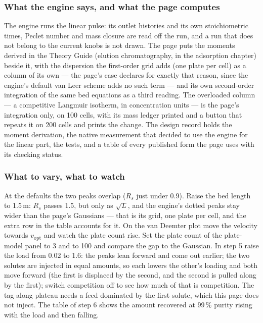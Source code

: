 \documentclass[11pt,a4paper]{article}
\begin{document}
\subsubsection*{What the engine says, and what the page computes}

The engine runs the linear pulse: its outlet histories and its own
stoichiometric times, Peclet number and mass closure are read off the run,
and a run that does not belong to the current knobs is not drawn.  The page
puts the moments derived in the Theory Guide (elution chromatography, in the adsorption chapter) beside it, with the
dispersion the first-order grid adds (one plate per cell) as a
column of its own --- the page's case declares  for exactly that reason, since the engine's default van Leer
scheme adds no such term --- and its own second-order integration of the same bed
equations as a third reading.  The overloaded column --- a competitive
Langmuir isotherm, in concentration units --- is the page's integration
only, on 100 cells, with its mass ledger printed and a button that repeats
it on 200 cells and prints the change.  The design record
 holds the moment
derivation, the native measurement that decided to use the engine for the
linear part, the tests, and a table of every published form the page uses
with its checking status.

\subsubsection*{What to vary, what to watch}

\begin{tryit}
At the defaults the two peaks overlap ($R_s$ just under 0.9).  Raise the bed
length to 1.5\,m: $R_s$ passes 1.5, but only as $\sqrt{L}$, and the engine's
dotted peaks stay wider than the page's Gaussians --- that is its grid, one
plate per cell, and the extra row in the table accounts for it.  On the
van Deemter plot move the velocity towards $v_{\mathrm{opt}}$ and watch the
plate count rise.  Set the plate count of the plate-model panel to 3 and to
100 and compare the gap to the Gaussian.  In step 5 raise the load from 0.02
to 1.6: the peaks lean forward and come out earlier; the two solutes are
injected in equal amounts, so each lowers the other's loading and both move
forward (the first is displaced by the second, and the second is pulled
along by the first); switch competition off to see how much of that is
competition.  The tag-along plateau needs a feed dominated by the first
solute, which this page does not inject.  The table of step 6 shows the amount recovered at 99\,\%
purity rising with the load and then falling.
\end{tryit}
\end{document}
